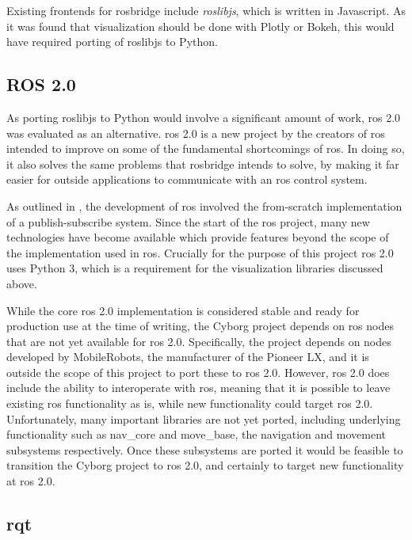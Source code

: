 \documentclass[\rootfolder/main.tex]{subfiles}
\begin{document}
Existing frontends for rosbridge include \emph{roslibjs}, which is written in Javascript.
As it was found that visualization should be done with Plotly or Bokeh, this would have required porting of roslibjs to Python.

\subsection{ROS 2.0}

As porting roslibjs to Python would involve a significant amount of work, \acrshort{ros} 2.0 was evaluated as an alternative.
\acrshort{ros} 2.0 is a new project by the creators of \acrshort{ros} intended to improve on some of the fundamental shortcomings of \acrshort{ros}.
In doing so, it also solves the same problems that rosbridge intends to solve, by making it far easier for outside applications to communicate with an \acrshort{ros} control system.

As outlined in \cite{Gerkey2017}, the development of \acrshort{ros} involved the from-scratch implementation of a publish-subscribe system.
Since the start of the \acrshort{ros} project, many new technologies have become available which provide features beyond the scope of the implementation used in \acrshort{ros}.
Crucially for the purpose of this project \acrshort{ros} 2.0 uses Python 3, which is a requirement for the visualization libraries discussed above.

While the core \acrshort{ros} 2.0 implementation is considered stable and ready for production use at the time of writing, the Cyborg project depends on \acrshort{ros} nodes that are not yet available for \acrshort{ros} 2.0.
Specifically, the project depends on nodes developed by MobileRobots, the manufacturer of the Pioneer LX, and it is outside the scope of this project to port these to \acrshort{ros} 2.0.
However, \acrshort{ros} 2.0 does include the ability to interoperate with \acrshort{ros}, meaning that it is possible to leave existing \acrshort{ros} functionality as is, while new functionality could target \acrshort{ros} 2.0.
Unfortunately, many important libraries are not yet ported, including underlying functionality such as nav\_core and move\_base, the navigation and movement subsystems respectively.
Once these subsystems are ported it would be feasible to transition the Cyborg project to \acrshort{ros} 2.0, and certainly to target new functionality at \acrshort{ros} 2.0.

\subsection{rqt}
\end{document}
